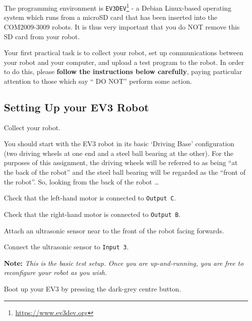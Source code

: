 \documentclass[hidelinks,a4paper,11pt]{article}
\begin{document}
The programming environment is \texttt{EV3DEV}\footnote{\url{https://www.ev3dev.org}} - a Debian Linux-based operating system which runs from a microSD card that has been inserted into the COM2009-3009 robots.  It is thus very important that you do NOT remove this SD card from your robot.

Your first practical task is to collect your robot, set up communications between your robot and your computer, and upload a test program to the robot.  In order to do this, please \textbf{follow the instructions below carefully}, paying particular attention to those which say ``{\color {red} DO NOT}'' perform some action.


\subsection{Setting Up your EV3 Robot}

\begin{todolist}
	\item Collect your robot.
 \end{todolist}
 
You should start with the EV3 robot in its basic `Driving Base' configuration (two driving wheels at one end and a steel ball bearing at the other).  For the purposes of this assignment, the driving wheels will be referred to as being ``at the back of the robot'' and the steel ball bearing will be regarded as the ``front of the robot''.  So, looking from the back of the robot \ldots

\begin{todolist}
	\item Check that the left-hand motor is connected to \texttt{Output C}.
	\item Check that the right-hand motor is connected to \texttt{Output B}.
	\item Attach an ultrasonic sensor near to the front of the robot facing forwards.
	\item Connect the ultrasonic sensor to \texttt{Input 3}.
\end{todolist}

{\bfseries Note:}  \emph{This is the basic test setup.  Once you are up-and-running, you are free to reconfigure your robot as you wish.}

\begin{todolist}
	\item Boot up your EV3 by pressing the dark-grey centre button.
 \end{todolist}
 
\end{document}
